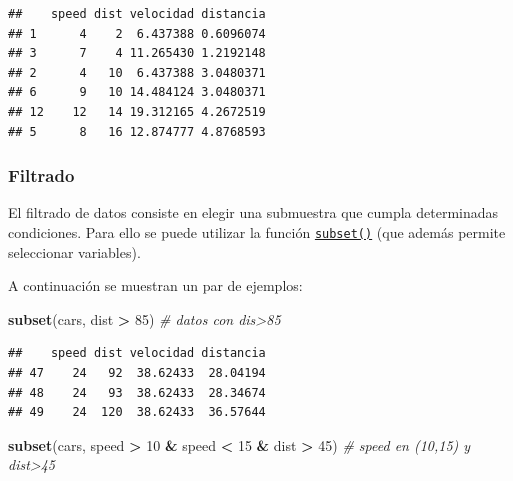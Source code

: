 \documentclass[]{book}
\newenvironment{Shaded}{\begin{snugshade}}{\end{snugshade}}
\newcommand{\CommentTok}[1]{\textcolor[rgb]{0.56,0.35,0.01}{\textit{#1}}}
\newcommand{\DecValTok}[1]{\textcolor[rgb]{0.00,0.00,0.81}{#1}}
\newcommand{\KeywordTok}[1]{\textcolor[rgb]{0.13,0.29,0.53}{\textbf{#1}}}
\newcommand{\NormalTok}[1]{#1}
\newcommand{\OperatorTok}[1]{\textcolor[rgb]{0.81,0.36,0.00}{\textbf{#1}}}
\newcommand{\StringTok}[1]{\textcolor[rgb]{0.31,0.60,0.02}{#1}}
\begin{document}
\begin{Shaded}
\end{Shaded}

\begin{verbatim}
##    speed dist velocidad distancia
## 1      4    2  6.437388 0.6096074
## 3      7    4 11.265430 1.2192148
## 2      4   10  6.437388 3.0480371
## 6      9   10 14.484124 3.0480371
## 12    12   14 19.312165 4.2672519
## 5      8   16 12.874777 4.8768593
\end{verbatim}

\hypertarget{filtrado}{%
\subsubsection{Filtrado}\label{filtrado}}

El filtrado de datos consiste en
elegir una submuestra que cumpla determinadas condiciones. Para ello se
puede utilizar la función \href{https://www.rdocumentation.org/packages/base/versions/3.6.1/topics/subset}{\texttt{subset()}}
(que además permite seleccionar variables).

A continuación se muestran un par de ejemplos:

\begin{Shaded}
\begin{Highlighting}[]
\KeywordTok{subset}\NormalTok{(cars, dist }\OperatorTok{>}\StringTok{ }\DecValTok{85}\NormalTok{) }\CommentTok{# datos con dis>85}
\end{Highlighting}
\end{Shaded}

\begin{verbatim}
##    speed dist velocidad distancia
## 47    24   92  38.62433  28.04194
## 48    24   93  38.62433  28.34674
## 49    24  120  38.62433  36.57644
\end{verbatim}

\begin{Shaded}
\begin{Highlighting}[]
\KeywordTok{subset}\NormalTok{(cars, speed }\OperatorTok{>}\StringTok{ }\DecValTok{10} \OperatorTok{&}\StringTok{ }\NormalTok{speed }\OperatorTok{<}\StringTok{ }\DecValTok{15} \OperatorTok{&}\StringTok{ }\NormalTok{dist }\OperatorTok{>}\StringTok{ }\DecValTok{45}\NormalTok{) }\CommentTok{# speed en (10,15) y dist>45}
\end{Highlighting}
\end{Shaded}
\end{document}
